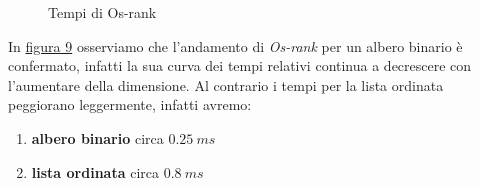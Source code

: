 \documentclass[onecolumn]{article}
\begin{document}
\begin{figure}[H]
	\caption{Tempi di Os-rank}
	\label{fig:os-rank-l}
\end{figure}

In \hyperref[fig:os-rank-l]{figura 9} osserviamo che l'andamento di \textit{Os-rank} per un albero binario è confermato, infatti la sua curva dei tempi relativi continua a decrescere con l'aumentare della dimensione. Al contrario i tempi per la lista ordinata peggiorano leggermente, infatti avremo:

\begin{enumerate}
    \item \textbf{albero binario} circa \(0.25\:ms\)
    \item \textbf{lista ordinata} circa \(0.8\:ms\)
\end{enumerate}
\end{document}
